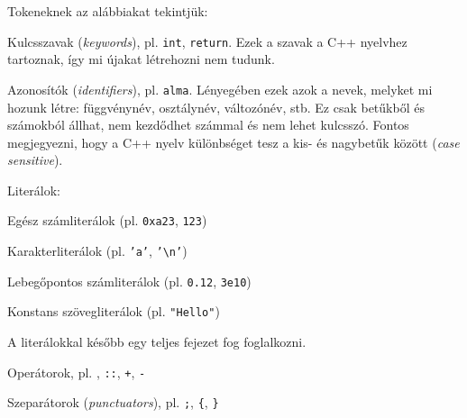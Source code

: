 \documentclass[../cpp_book/cpp_book.tex]{subfiles}
\begin{document}
	Tokeneknek az alábbiakat tekintjük:
	\begin{compactitem}
		\item Kulcsszavak (\textit{keywords}), pl. \texttt{int}, \texttt{return}. Ezek a szavak a C++ nyelvhez tartoznak, így mi újakat létrehozni nem tudunk.
		\item Azonosítók (\textit{identifiers}), pl. \texttt{alma}. Lényegében ezek azok a nevek, melyket mi hozunk létre: függvénynév, osztálynév, változónév, stb. Ez csak betűkből és számokból állhat, nem kezdődhet számmal és nem lehet kulcsszó. Fontos megjegyezni, hogy a C++ nyelv különbséget tesz a kis- és nagybetűk között (\textit{case sensitive}).
 		\item Literálok:
		\begin{compactitem}
			\item Egész számliterálok (pl. \texttt{0xa23}, \texttt{123})
			\item Karakterliterálok (pl. \texttt{'a'}, \texttt{'\textbackslash n'})
			\item Lebegőpontos számliterálok (pl. \texttt{0.12}, \texttt{3e10})
			\item Konstans szövegliterálok (pl. \texttt{"Hello"})
		\end{compactitem}
		A literálokkal később egy teljes fejezet fog foglalkozni.
		\item Operátorok, pl. \texttt{\<}, \texttt{::}, \texttt{+}, \texttt{-}
		\item Szeparátorok (\textit{punctuators}), pl. \texttt{;}, \texttt{\{}, \texttt{\}}
	\end{compactitem}
\end{document}
